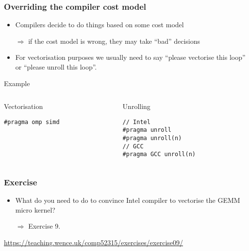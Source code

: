 \documentclass[presentation,aspectratio=43,10pt]{beamer}
\begin{document}
\begin{frame}[fragile]
  \frametitle{Overriding the compiler cost model}
  \begin{itemize}
  \item Compilers decide to do things based on some cost model
  \item[$\Rightarrow$] if the cost model is wrong, they may take
    ``bad'' decisions
  \item For vectorisation purposes we usually need to say ``please
    vectorise this loop'' or ``please unroll this loop''.
  \end{itemize}
  \begin{exampleblock}{Example}
    \vspace{0.5\baselineskip}
    \begin{columns}[t]
      \begin{column}{0.45\textwidth}
        Vectorisation
\begin{verbatim}
#pragma omp simd
\end{verbatim}
      \end{column}
      \begin{column}{0.45\textwidth}
        Unrolling
\begin{verbatim}
// Intel
#pragma unroll
#pragma unroll(n)
// GCC
#pragma GCC unroll(n)
\end{verbatim}
      \end{column}
    \end{columns}
  \end{exampleblock}
\end{frame}

\begin{frame}
  \frametitle{Exercise}
  \begin{itemize}
  \item What do you need to do to convince Intel compiler to vectorise the
    GEMM micro kernel?
  \item[$\Rightarrow$] Exercise 9.
  \end{itemize}

  \begin{center}
    \url{https://teaching.wence.uk/comp52315/exercises/exercise09/}
  \end{center}
\end{frame}
\end{document}
